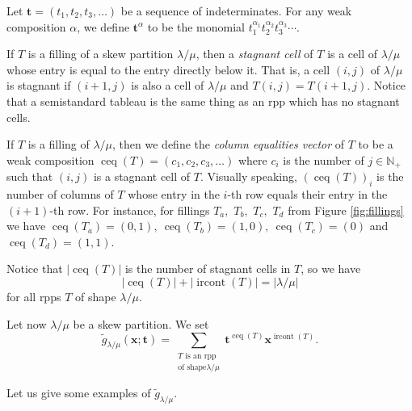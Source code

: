 \documentclass[numbers=enddot,12pt,final,onecolumn,notitlepage]{scrartcl}%
\theoremstyle{definition}
\let\sumnonlimits\sum
\renewcommand{\sum}{\sumnonlimits\limits}
\def\ceq{{\operatorname*{ceq}}}
\def\ircont{{\operatorname*{ircont}}}
\def\t{{\mathbf{t}}}
\def\lm{{\lambda/\mu}}
\begin{document}
 Let $\t=\left(t_{1},t_{2},t_{3},\ldots\right)$ be a sequence of indeterminates. For any weak composition $\alpha$, we define $\t^\alpha$ to be the monomial $t_1^{\alpha_1} t_2^{\alpha_2} t_3^{\alpha_3} \cdots$.

 If $T$ is a filling of a skew partition $\lm$,
then a \textit{stagnant cell} of $T$ is a cell of $\lm$ whose entry is equal to the entry directly below it. That is, a cell $\left(  i,j\right)  $
of $\lm$ is stagnant if $\left(  i+1,j\right)  $ is also a cell of $\lm$ and 
$T\left(  i,j\right)  =T\left(  i+1,j\right)  $. Notice that a semistandard
tableau is the same thing as an rpp which has no stagnant
cells.


 If $T$ is a filling of $\lm$,
then we define the \textit{column equalities vector} of $T$ to be a weak composition $\operatorname*{ceq}\left(  T\right)=\left(c_1,c_2,c_3,\dots\right)$ 
where $c_i$ is the number of $j\in\mathbb{N}_{+}$ such that $\left(  i,j\right)$ is a stagnant cell of $T$. Visually speaking, $\left(  \operatorname*{ceq}\left(  T\right)  \right)
_{i}$ is the number of columns of $T$ whose entry in the $i$-th row equals
their entry in the $\left(  i+1\right)  $-th row. For instance, for fillings $T_a,$ $T_b,$ $T_c,$ $T_d$ from Figure \ref{fig:fillings} we have $\ceq(T_a)=(0,1),\ \ceq(T_b)=(1,0),\ \ceq(T_c)=(0)$ and $\ceq(T_d)=(1,1)$. 

Notice that $\left|\ceq(T)\right|$ is the number of stagnant cells in $T$, so we have 
\begin{equation}\label{eq:sum.of.ceq.and.ircont}
 \left|\ceq(T)\right|+\left|\ircont(T)\right|=\left|\lm\right|
\end{equation}
 for all rpps $T$ of shape $\lm$. 




Let now $\lambda/\mu$ be a skew partition. We set%
\[
\widetilde{g}_{\lambda/\mu}(\mathbf{x};\t)=\sum_{\substack{T\text{ is an rpp}\\\text{of shape
}\lm  }}\mathbf{t}^{\operatorname*{ceq}\left(
T\right)  }\mathbf{x}^{\operatorname*{ircont}\left(  T\right)  }.
\]



Let us give some examples of $\widetilde{g}_{\lambda/\mu}$.
\end{document}
